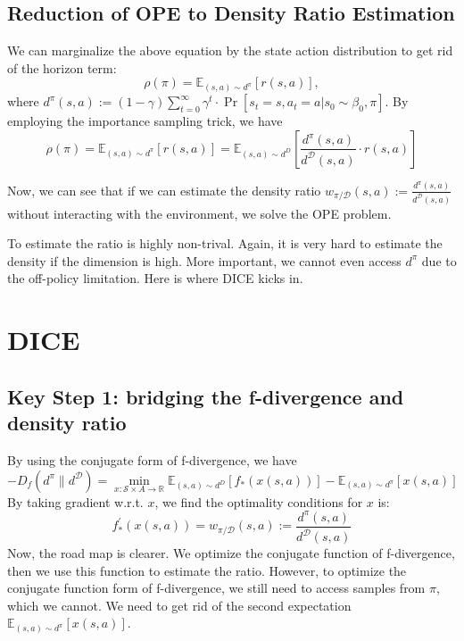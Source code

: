 \documentclass[a4paper]{article}
\theoremstyle{definition}
\begin{document}
\subsection{Reduction of OPE to Density Ratio Estimation}
We can marginalize the above equation by the state action distribution to get rid of the horizon term:
\begin{equation}
\rho(\pi)=\mathbb{E}_{(s, a) \sim d^{\pi}}[r(s, a)],
\end{equation}
where $
d^{\pi}(s, a):=(1-\gamma) \sum_{t=0}^{\infty} \gamma^{t} \cdot \operatorname{Pr}\left[s_{t}=s, a_{t}=a | s_{0} \sim \beta_{0}, \pi\right]
$.
By employing the importance sampling trick, we have
\begin{equation}
\rho(\pi)=\mathbb{E}_{(s, a) \sim d^{\pi}}[r(s, a)]=\mathbb{E}_{(s, a) \sim d^{D}}\left[\frac{d^{\pi}(s, a)}{d^{\mathcal{D}}(s, a)} \cdot r(s, a)\right]
\end{equation}

Now, we can see that if we can estimate the density ratio $
w_{\pi / \mathcal{D}}(s, a):=\frac{d^{\pi}(s, a)}{d^{\mathcal{D}}(s, a)}
$ without interacting with the environment, we solve the OPE problem.

To estimate the ratio is highly non-trival. Again, it is very hard to estimate the density if the dimension is high. More important, we cannot even access $d^{\pi}$ due to the off-policy limitation. Here is where DICE kicks in.

\section{DICE}
\subsection{Key Step 1: bridging the f-divergence and density ratio}
By using the conjugate form of f-divergence, we have
\begin{equation}
-D_{f}\left(d^{\pi} \| d^{\mathcal{D}}\right)=\min _{x: \mathcal{S} \times A \rightarrow \mathbb{R}} \mathbb{E}_{(s, a) \sim d^{D}}\left[f_{*}(x(s, a))\right]-\mathbb{E}_{(s, a) \sim d^{\pi}}[x(s, a)]
\end{equation}
By taking gradient w.r.t. $x$, we find the optimality conditions for $x$ is:
\begin{equation}
f_{*}^{\prime}(x(s, a))=w_{\pi / \mathcal{D}}(s, a):=\frac{d^{\pi}(s, a)}{d^{\mathcal{D}}(s, a)}
\end{equation}
Now, the road map is clearer. We optimize the conjugate function of f-divergence, then we use this function to estimate the ratio.
However, to optimize the conjugate function form of f-divergence, we still need to access samples from $\pi$, which we cannot. We need to get rid of the second expectation $\mathbb{E}_{(s, a) \sim d^{\pi}}[x(s, a)]$.
\end{document}
